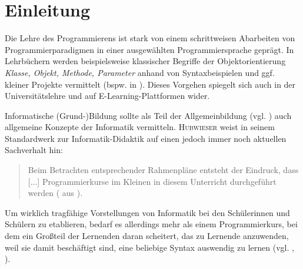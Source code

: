 \documentclass[paper=a4, DIV=13, BCOR=8mm, oneside=on, onecolumn=on, open = any, titlepage =on, parskip =half-, headsepline = on, footsepline = off, chapterprefix = on, sectionprefix = on, appendixprefix = off, fontsize = 12pt, numbers = noenddot, abstract = off]{scrreprt}
\begin{document}
\newpage
\thispagestyle{plain}




\thispagestyle{plain}
\newpage
\thispagestyle{empty}

%
%
{}
\newcommand{\hsp}{\hspace{20pt}}
\titleformat{\chapter}[hang]{\Large\bfseries}{\thechapter\hsp\textcolor{gray75}{|}\hsp}{0pt}{\Large\bfseries}

\tableofcontents
\cleardoublepage
{}
\par \singlespacing
\renewcommand*{\dictumwidth}{.6667\textwidth}
\chapter{Einleitung}
\label{sec:einleitung}
\onehalfspacing
\vspace*{-1cm}

Die Lehre des Programmierens ist stark von einem schrittweisen Abarbeiten von Programmierparadigmen in einer ausgewählten Programmiersprache geprägt. In Lehrbüchern werden beispielsweise klassischer Begriffe der Objektorientierung \emph{Klasse, Objekt, Methode, Parameter} anhand von Syntaxbeispielen und ggf. kleiner Projekte vermittelt (bspw. in \cite{abts:15} \cite{barnes:03} \cite{ehmann:09} \cite{ullenboom:12}). Dieses Vorgehen spiegelt sich auch in der Universitätslehre und auf E-Learning-Plattformen wider. 

Informatische (Grund-)Bildung sollte als Teil der Allgemeinbildung (vgl. \cite{breier:94}) auch allgemeine Konzepte der Informatik vermitteln. \textsc{Hubwieser} weist in seinem Standardwerk zur Informatik-Didaktik auf einen jedoch immer noch aktuellen Sachverhalt hin:
\begin{quote}
\normalsize
Beim Betrachten entsprechender Rahmenpläne entsteht der Eindruck, dass [...] Programmierkurse im Kleinen in diesem Unterricht durchgeführt werden (\cite[S.40]{hubwieser:07} aus \cite{koerber:93}).
\end{quote}
\normalsize
Um wirklich tragfähige Vorstellungen von Informatik bei den Schülerinnen und Schülern zu etablieren, bedarf es allerdings mehr als einem Programmierkurs, bei dem ein Großteil der Lernenden daran scheitert, das zu Lernende anzuwenden, weil sie damit beschäftigt sind, eine beliebige Syntax auswendig zu lernen (vgl. \cite{humbert:02}, \cite{modrow:11}).
\end{document}
